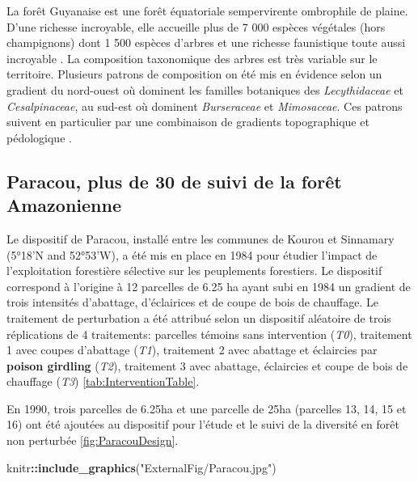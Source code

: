 \documentclass[
  11pt,
  french,
  A4paper,
  extrafontsizes,onecolumn,openright
  ]{memoir}
\newenvironment{Shaded}{\begin{snugshade}}{\end{snugshade}}
\newcommand{\KeywordTok}[1]{\textcolor[rgb]{0.13,0.29,0.53}{\textbf{#1}}}
\newcommand{\StringTok}[1]{\textcolor[rgb]{0.31,0.60,0.02}{#1}}
\newcommand{\OperatorTok}[1]{\textcolor[rgb]{0.81,0.36,0.00}{\textbf{#1}}}
\newcommand{\NormalTok}[1]{#1}
\begin{document}
La forêt Guyanaise est une forêt équatoriale sempervirente ombrophile de
plaine. D'une richesse incroyable, elle accueille plus de 7 000 espèces
végétales (hors champignons) dont 1 500 espèces d'arbres et une richesse
faunistique toute aussi incroyable \autocite{DeNoter2008}. La
composition taxonomique des arbres est très variable sur le territoire.
Plusieurs patrons de composition on été mis en évidence selon un
gradient du nord-ouest où dominent les familles botaniques des
\emph{Lecythidaceae} et \emph{Cesalpinaceae}, au sud-est où dominent
\emph{Burseraceae} et \emph{Mimosaceae}. Ces patrons suivent en
particulier par une combinaison de gradients topographique et
pédologique \autocites{Sabatier1989}[ cf
Toto]{Sabatier1997}{Guitet2015}.

\subsection{Paracou, plus de 30 de suivi de la forêt
Amazonienne}\label{paracou-plus-de-30-de-suivi-de-la-foret-amazonienne}

Le dispositif de Paracou, installé entre les communes de Kourou et
Sinnamary (5°18'N and 52°53'W), a été mis en place en 1984 pour étudier
l'impact de l'exploitation forestière sélective sur les peuplements
forestiers. Le dispositif correspond à l'origine à 12 parcelles de 6.25
ha ayant subi en 1984 un gradient de trois intensités d'abattage,
d'éclairices et de coupe de bois de chauffage. Le traitement de
perturbation a été attribué selon un dispositif aléatoire de trois
réplications de 4 traitements: parcelles témoins sans intervention
(\emph{T0}), traitement 1 avec coupes d'abattage (\emph{T1}), traitement
2 avec abattage et éclaircies par \textbf{poison girdling} (\emph{T2}),
traitement 3 avec abattage, éclaircies et coupe de bois de chauffage
(\emph{T3}) \ref{tab:InterventionTable}.

En 1990, trois parcelles de 6.25ha et une parcelle de 25ha (parcelles
13, 14, 15 et 16) ont été ajoutées au dispositif pour l'étude et le
suivi de la diversité en forêt non perturbée \ref{fig:ParacouDesign}.

\begin{Shaded}
\begin{Highlighting}[]
\NormalTok{knitr}\OperatorTok{::}\KeywordTok{include_graphics}\NormalTok{(}\StringTok{"ExternalFig/Paracou.jpg"}\NormalTok{)}
\end{Highlighting}
\end{Shaded}
\end{document}
